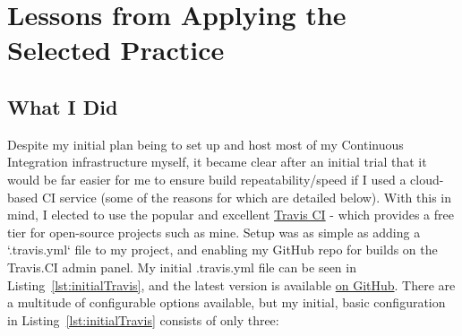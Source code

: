 \section{Lessons from Applying the Selected Practice}
\label{sec:Lessons from Applying the Selected Practice}

\subsection{What I Did}
\label{sub:What I Did}


Despite my initial plan being to set up and host most of my Continuous
Integration infrastructure myself, it became clear after an initial trial
that it would be far easier for me to ensure build repeatability/speed if I used
a cloud-based CI service (some of the reasons for which are detailed below).
With this in mind, I elected to use the popular and
excellent \href{https://travis-ci.org/}{Travis CI} - which provides a free tier
for open-source projects such as mine. Setup was as simple as adding a
`.travis.yml` file to my project, and enabling my GitHub repo for builds on
the Travis.CI admin panel. My initial .travis.yml file can be seen in
Listing~\ref{lst:initialTravis}, and the latest version is available
\href{https://github.com/FireEater64/gamq/blob/master/.travis.yml}{on GitHub}.
There are a multitude of configurable options available, but
my initial, basic configuration in Listing~\ref{lst:initialTravis} consists of
only three:

